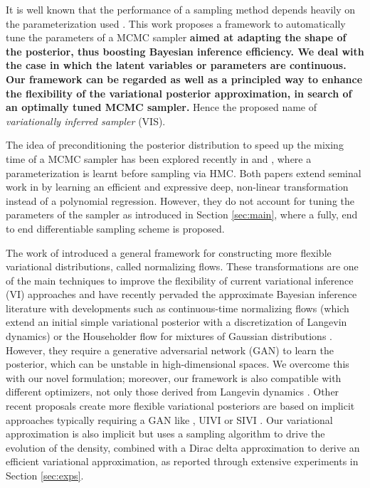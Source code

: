 It is well known that the performance of a sampling method depends
heavily on the parameterization used \cite{papaspiliopoulos2007general}. This work proposes
a framework to automatically tune the parameters of a 
MCMC sampler {\bf  aimed at adapting the shape of the posterior, thus boosting Bayesian inference efficiency. 
 We deal with the case in which the latent variables or parameters are continuous. Our framework can be regarded as well as a principled way to enhance the flexibility of the variational posterior approximation, in search of an optimally tuned MCMC sampler.}
Hence the proposed name of {\em variationally inferred sampler} (VIS).


{ \bf

The idea of preconditioning the posterior distribution to speed up the mixing time of a MCMC sampler has been explored recently in \cite{hoffmanneutra} and \cite{PhysRevLett.121.260601}, where a parameterization is learnt before sampling via HMC. Both papers extend seminal work in \cite{parno2014transport} by learning an efficient and expressive deep, non-linear transformation instead of a polynomial regression. However, they do not account for tuning the parameters of the sampler as introduced in Section \ref{sec:main}, where a fully, end to end differentiable sampling scheme is proposed.

The work of \cite{rezende2015variational} introduced a general
framework for constructing more flexible variational distributions, called normalizing flows. These transformations are one of the main techniques to improve the flexibility of current variational inference (VI) approaches and have recently pervaded the approximate Bayesian inference
literature with developments such as continuous-time normalizing flows \cite{chen2018continuoustime} (which extend an initial simple variational posterior with a discretization of Langevin dynamics) or the Householder flow for mixtures of Gaussian distributions \cite{LIU201943}. However, they require a generative adversarial network (GAN) \cite{goodfellow2014generative} to learn the posterior,
which can be unstable in high-dimensional spaces. We overcome this with our novel formulation; moreover, our framework is also compatible with different optimizers, not only those derived from Langevin dynamics \cite{10.5555/3122009.3208015}. Other recent proposals create more flexible variational posteriors are based on implicit approaches typically requiring a GAN like \cite{huszar2017variational}, UIVI \cite{pmlr-v89-titsias19a} or SIVI \cite{yin2018semi}. Our variational approximation is also implicit but uses a sampling algorithm to drive the evolution of the density, combined with a Dirac delta approximation to derive an efficient variational approximation, as reported through extensive experiments in Section \ref{sec:exps}.

}

